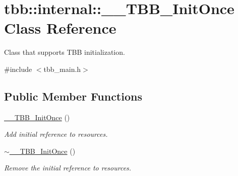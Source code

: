 \hypertarget{classtbb_1_1internal_1_1____TBB__InitOnce}{}\section{tbb\+:\+:internal\+:\+:\+\_\+\+\_\+\+T\+B\+B\+\_\+\+Init\+Once Class Reference}
\label{classtbb_1_1internal_1_1____TBB__InitOnce}


Class that supports T\+B\+B initialization.  




{\ttfamily \#include $<$tbb\+\_\+main.\+h$>$}

\subsection*{Public Member Functions}
\begin{DoxyCompactItemize}
\item 
\hyperlink{classtbb_1_1internal_1_1____TBB__InitOnce_a38012fc1dc4a713f1b5b46f58dfec319}{\+\_\+\+\_\+\+T\+B\+B\+\_\+\+Init\+Once} ()
\begin{DoxyCompactList}\small\item\em Add initial reference to resources. \end{DoxyCompactList}\item 
\hyperlink{classtbb_1_1internal_1_1____TBB__InitOnce_aef2402e6d0b42fc5521b9f4ed008af11}{$\sim$\+\_\+\+\_\+\+T\+B\+B\+\_\+\+Init\+Once} ()
\begin{DoxyCompactList}\small\item\em Remove the initial reference to resources. \end{DoxyCompactList}\end{DoxyCompactItemize}
